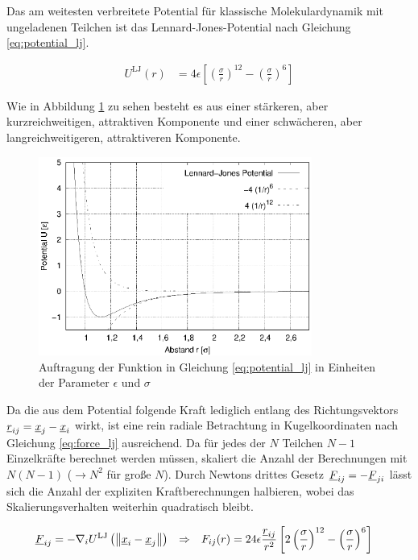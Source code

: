 		Das am weitesten verbreitete Potential für klassische Molekulardynamik mit ungeladenen
		Teilchen ist das Lennard-Jones-Potential nach Gleichung \eqref{eq:potential_lj}.

		\begin{align}
			U^\text{LJ}(r) &= 4\epsilon \left[
				\left(\frac{\sigma}{r}\right)^{12}
				-
				\left(\frac{\sigma}{r}\right)^{6}
			\right] \label{eq:potential_lj}
		\end{align}

		Wie in Abbildung \ref{fig:potential_lj} zu sehen besteht es aus einer stärkeren, aber
		kurzreichweitigen, attraktiven Komponente und einer schwächeren, aber langreichweitigeren,
		attraktiveren Komponente.

		\begin{figure}[!ht]
			\centering
			\includegraphics[width=0.8\textwidth]{chapter/main/plt/lennard_jones.eps}
			\caption{Auftragung der Funktion in Gleichung \eqref{eq:potential_lj} in Einheiten
			der Parameter $\epsilon$ und $\sigma$}
			\label{fig:potential_lj}
		\end{figure}

		Da die aus dem Potential folgende Kraft lediglich entlang des Richtungsvektors
		$\underline{r}_{ij} = \underline{x}_j - \underline{x}_i$ wirkt, ist eine rein radiale Betrachtung in
		Kugelkoordinaten nach Gleichung \eqref{eq:force_lj} ausreichend. Da für jedes der $N$
		Teilchen $N-1$ Einzelkräfte berechnet werden müssen, skaliert die Anzahl der Berechnungen
		mit $N(N-1)$ ($\rightarrow N^2$ für große $N$). Durch Newtons drittes Gesetz
		$\underline{F}_{ij} = -\underline{F}_{ji}$ lässt sich die Anzahl der expliziten Kraftberechnungen
		halbieren, wobei das Skalierungsverhalten weiterhin quadratisch bleibt.

		\begin{align}
			\underline{F}_{ij} &= -\nabla_i U^\text{LJ}\left(
				\left\|\underline{x}_i - \underline{x}_j\right\|
			\right) \nonumber
			&\Rightarrow&&
			F_{ij}(r) &= 24\epsilon \frac{\underline{r}_{ij}}{r^2} \left[
				2\left(\frac{\sigma}{r}\right)^{12}
				-
				\left(\frac{\sigma}{r}\right)^{6}
			\right] \label{eq:force_lj}
		\end{align}

